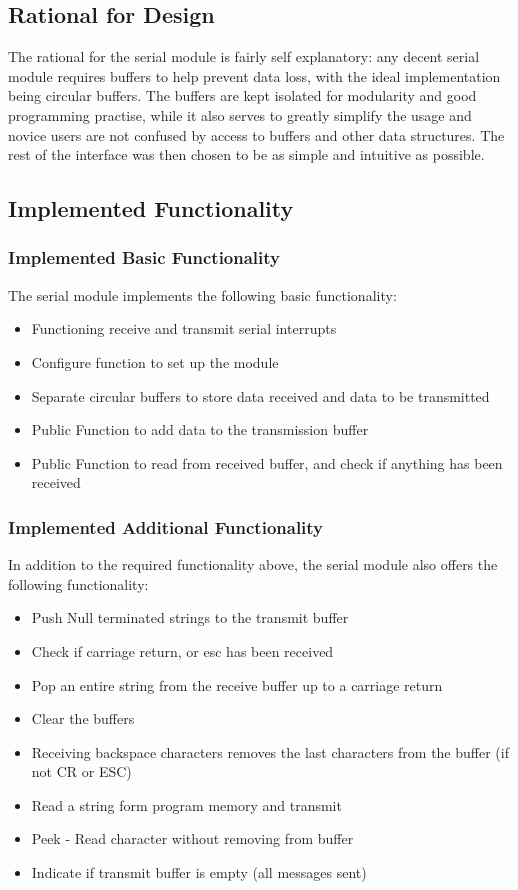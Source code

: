 \documentclass[]{report}
\begin{document}
\subsection{Rational for Design}
The rational for the serial module is fairly self explanatory: any decent serial module requires buffers to help prevent data loss, with the ideal implementation being circular buffers. The buffers are kept isolated for modularity and good programming practise, while it also serves to greatly simplify the usage and novice users are not confused by access to buffers and other data structures. The rest of the interface was then chosen to be as simple and intuitive as possible.

\subsection{Implemented Functionality}
\subsubsection{Implemented Basic Functionality}
The serial module implements the following basic functionality:
\begin{itemize}
	\item Functioning receive and transmit serial interrupts
	\item Configure function to set up the module
	\item Separate circular buffers to store data received and data to be transmitted
	\item Public Function to add data to the transmission buffer
	\item Public Function to read from received buffer, and check if anything has been received
\end{itemize}


\subsubsection{Implemented Additional Functionality}
In addition to the required functionality above, the serial module also offers the following functionality:
\begin{itemize}
	\item Push Null terminated strings to the transmit buffer
	\item Check if carriage return, or esc has been received
	\item Pop an entire string from the receive buffer up to a carriage return
	\item Clear the buffers
	\item Receiving backspace characters removes the last characters from the buffer (if not CR or ESC)
	\item Read a string form program memory and transmit
	\item Peek - Read character without removing from buffer
	\item Indicate if transmit buffer is empty (all messages sent)
\end{itemize}
\end{document}
